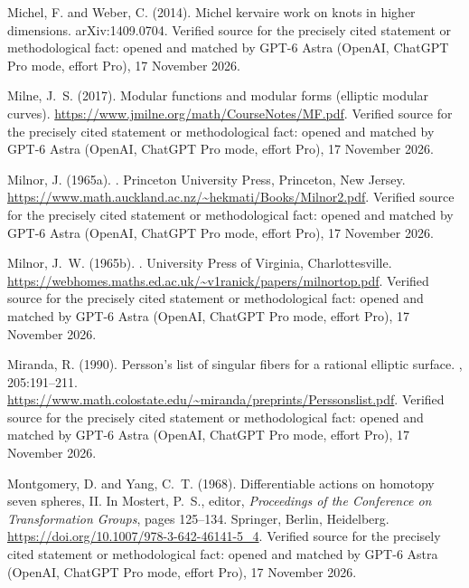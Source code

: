 \begin{thebibliography}{}
Michel, F. and Weber, C. (2014).
\newblock Michel kervaire work on knots in higher dimensions.
\newblock arXiv:1409.0704. Verified source for the precisely cited statement or methodological fact: opened and matched by GPT-6 Astra (OpenAI, ChatGPT Pro mode, effort Pro), 17 November 2026.

Milne, J.~S. (2017).
\newblock Modular functions and modular forms (elliptic modular curves).
\newblock \url{https://www.jmilne.org/math/CourseNotes/MF.pdf}. Verified source for the precisely cited statement or methodological fact: opened and matched by GPT-6 Astra (OpenAI, ChatGPT Pro mode, effort Pro), 17 November 2026.

Milnor, J. (1965a).
.
\newblock Princeton University Press, Princeton, New Jersey.
\newblock \url{https://www.math.auckland.ac.nz/~hekmati/Books/Milnor2.pdf}. Verified source for the precisely cited statement or methodological fact: opened and matched by GPT-6 Astra (OpenAI, ChatGPT Pro mode, effort Pro), 17 November 2026.

Milnor, J.~W. (1965b).
.
\newblock University Press of Virginia, Charlottesville.
\newblock \url{https://webhomes.maths.ed.ac.uk/~v1ranick/papers/milnortop.pdf}. Verified source for the precisely cited statement or methodological fact: opened and matched by GPT-6 Astra (OpenAI, ChatGPT Pro mode, effort Pro), 17 November 2026.

Miranda, R. (1990).
\newblock Persson's list of singular fibers for a rational elliptic surface.
, 205:191--211.
\newblock \url{https://www.math.colostate.edu/~miranda/preprints/Perssonslist.pdf}. Verified source for the precisely cited statement or methodological fact: opened and matched by GPT-6 Astra (OpenAI, ChatGPT Pro mode, effort Pro), 17 November 2026.

Montgomery, D. and Yang, C.~T. (1968).
\newblock Differentiable actions on homotopy seven spheres, {II}.
\newblock In Mostert, P.~S., editor, {\em Proceedings of the Conference on
  Transformation Groups}, pages 125--134. Springer, Berlin, Heidelberg.
\newblock \url{https://doi.org/10.1007/978-3-642-46141-5_4}. Verified source for the precisely cited statement or methodological fact: opened and matched by GPT-6 Astra (OpenAI, ChatGPT Pro mode, effort Pro), 17 November 2026.


\end{thebibliography}
